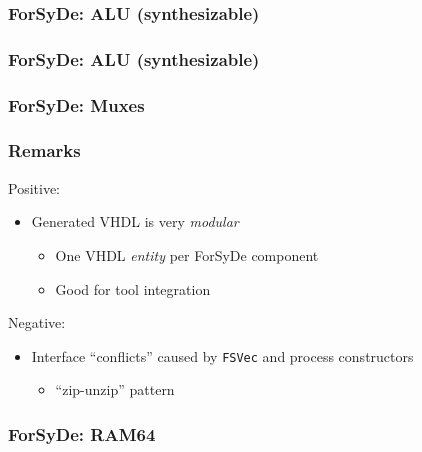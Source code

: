 \documentclass{beamer}
\begin{document}
            \begin{frame}
                \frametitle{ForSyDe: ALU (synthesizable)}
            \end{frame}

            \begin{frame}
                \frametitle{ForSyDe: ALU (synthesizable)}
            \end{frame}


            \begin{frame}
                \frametitle{ForSyDe: Muxes}
            \end{frame}

            \begin{frame}
                \frametitle{Remarks}
                \par{Positive:}
                \begin{itemize}
                    \item Generated VHDL is very \emph{modular}
                        \begin{itemize}
                            \item One VHDL \emph{entity} per ForSyDe component
                            \item Good for tool integration
                        \end{itemize}
                \end{itemize}

                \par{Negative:}
                \begin{itemize}
                    \item Interface ``conflicts'' caused by \texttt{FSVec} and process constructors
                        \begin{itemize}
                            \item ``zip-unzip'' pattern
                        \end{itemize}
                \end{itemize}
            \end{frame}

            \begin{frame}
                \frametitle{ForSyDe: RAM64}
            \end{frame}
\end{document}
